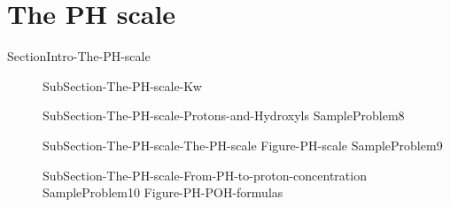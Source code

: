 \documentclass[main.tex]{subfiles}
\newcommand\chapterlabel{Ch-acidbase}\setcounter{figurenewcounter}{0}\setcounter{tablenewcounter}{0}\setcounter{formulanewcounter}{0}\chapterpicture{../{\chapterlabel}/figure1}\chapterpicturelabel{PngImg}
\begin{document}
\section{The PH scale}{SectionIntro-The-PH-scale}
\sloppy\begin{description}
\item[] {SubSection-The-PH-scale-Kw}
\item[] {SubSection-The-PH-scale-Protons-and-Hydroxyls}
{SampleProblem8}
\item[] {SubSection-The-PH-scale-The-PH-scale}
{Figure-PH-scale}
{SampleProblem9}
\item[] {SubSection-The-PH-scale-From-PH-to-proton-concentration}
{SampleProblem10}
{Figure-PH-POH-formulas}
\end{description}
\end{document}
